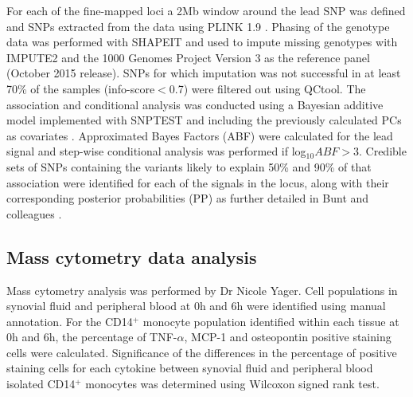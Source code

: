 
For each of the fine-mapped loci a 2Mb window around the lead SNP was defined and SNPs extracted from the data using PLINK 1.9 \parencite{Chang2015}. Phasing of the genotype data was performed with SHAPEIT \parencite{Delaneau2012} and used to impute missing genotypes with IMPUTE2 \parencite{Howie2009} and the 1000 Genomes Project Version 3 as the reference panel (October 2015 release). SNPs for which imputation was not successful in at least 70\% of the samples (info-score$<$0.7) were filtered out using QCtool. The association and conditional analysis was conducted using a Bayesian additive model implemented with SNPTEST and including the previously calculated PCs as covariates \parencite{Burton2007}. Approximated Bayes Factors (ABF) were calculated for the lead signal and step-wise conditional analysis was performed if log$_{10}ABF>$3. Credible sets of SNPs containing the variants likely to explain 50\% and 90\% of that association were identified for each of the signals in the locus, along with their corresponding posterior probabilities (PP) as further detailed in Bunt and colleagues \parencite{Bunt2015}.



\subsection{Mass cytometry data analysis}
Mass cytometry analysis was performed by Dr Nicole Yager. Cell populations in synovial fluid and peripheral blood at 0h and 6h were identified using manual annotation. For the CD14$^+$ monocyte population identified within each tissue at 0h and 6h, the percentage of TNF-$\alpha$, MCP-1 and osteopontin positive staining cells were calculated. Significance of the differences in the percentage of positive staining cells for each cytokine between synovial fluid and peripheral blood isolated CD14$^+$ monocytes was determined using Wilcoxon signed rank test.  

